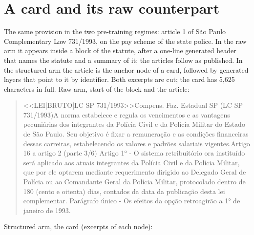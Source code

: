 \documentclass{IOS-Book-Article}
\begin{document}
\section{A card and its raw counterpart}
The same provision in the two pre-training regimes: article 1 of São Paulo Complementary Law 731/1993, on the pay scheme of the state police. In the raw arm it appears inside a block of the statute, after a one-line generated header that names the statute and a summary of it; the articles follow as published. In the structured arm the article is the anchor node of a card, followed by generated layers that point to it by identifier. Both excerpts are cut; the card has 5,625 characters in full.
Raw arm, start of the block and the article:
\begin{quote}\footnotesize\ttfamily\raggedright
<<LEI|\allowbreak{}BRUTO|\allowbreak{}LC SP 731/1993>>\newline
[LEI] Compens. Faz. Estadual SP (LC SP 731/1993) A norma estabelece e regula os vencimentos e as vantagens pecuniárias dos integrantes da Polícia Civil e da Polícia Militar do Estado de São Paulo. Seu objetivo é fixar a remuneração e as condições financeiras dessas carreiras, estabelecendo os valores e padrões salariais vigentes. Artigo 16 a artigo 2 (parte 3/6)\newline
[...]\newline
Artigo 1° - O sistema retribuitório ora instituído será aplicado aos atuais integrantes da Polícia Civil e da Polícia Militar, que por ele optarem mediante requerimento dirigido ao Delegado Geral de Polícia ou ao Comandante Geral da Polícia Militar, protocolado dentro de 180 (cento e oitenta) dias, contados da data da publicação desta lei complementar.\newline
Parágrafo único - Os efeitos da opção retroagirão a 1° de janeiro de 1993.\newline
[...]
\end{quote}
Structured arm, the card (excerpts of each node):
\end{document}

